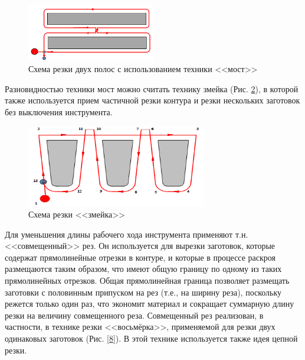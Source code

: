 \documentclass[11pt,twoside]{report}
\begin{document}
\begin{figure}
  \begin{center}
  \includegraphics[width=0.5\textwidth]{bridge.png}
  \caption{Схема резки двух полос с использованием техники <<мост>>}
  \label{bridge}
  \end{center}
\end{figure}

Разновидностью техники мост можно считать технику змейка
(Рис. \ref{snake}),
в которой также используется прием
частичной резки контура и резки
нескольких заготовок без выключения инструмента.

\begin{figure}
  \begin{center}
  \includegraphics[width=0.7\textwidth]{snake.png}
  \caption{Схема резки <<змейка>>}
  \label{snake}
  \end{center}
\end{figure}

Для уменьшения длины рабочего хода инструмента
применяют т.н. <<совмещенный>> рез.
Он используется для вырезки заготовок,
которые содержат прямолинейные отрезки в контуре,
и которые в процессе раскроя размещаются таким образом,
что имеют общую границу по одному из таких прямолинейных отрезков.
Общая прямолинейная граница позволяет размещать
заготовки с половинным припуском на рез
(т.е., на ширину реза),
поскольку режется только один раз,
что экономит материал и сокращает суммарную
длину резки на величину совмещенного реза.
Совмещенный рез реализован, в частности,
в технике резки <<восьмёрка>>,
применяемой для резки двух одинаковых заготовок
(Рис. \ref{8}).
В этой технике используется также идея цепной резки.
\end{document}
